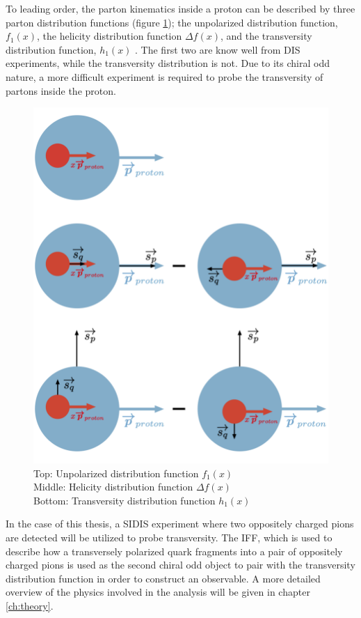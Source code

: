 \documentclass[abstract = on,listof=totoc, bibliography=totoc]{scrreprt}
\begin{document}
To leading order, the parton kinematics inside a proton can be described by three parton distribution functions (figure \ref{fig:PDFs}); the unpolarized distribution function, $f_1(x)$, the helicity distribution function $\Delta f (x)$, and the transversity distribution function, $h_1(x)$ \cite{JaffeTONS}. The first two are know well from DIS experiments, while the transversity distribution is not. Due to its chiral odd nature, a more difficult experiment is required to probe the transversity of partons inside the proton.  
\begin{figure}
\begin{center}
\includegraphics[width = .7\textwidth]{allDistsPic3}
\caption[Visual representation of unpolarized, hellicity, and transversity distribution functions]{Top: Unpolarized distribution function $f_1(x)$ \\
Middle: Helicity distribution function $\Delta f(x)$ \\
Bottom: Transversity distribution function $h_1(x)$}
\label{fig:PDFs}
\end{center}
\end{figure}
In the case of this thesis, a SIDIS experiment where two oppositely charged pions are detected will be utilized to probe transversity. The IFF, which is used to describe how a transversely polarized quark fragments into a pair of oppositely charged pions is used as the second chiral odd object to pair with the transversity distribution function in order to construct an observable. A more detailed overview of the physics involved in the analysis will be given in chapter \ref{ch:theory}.
\end{document}
